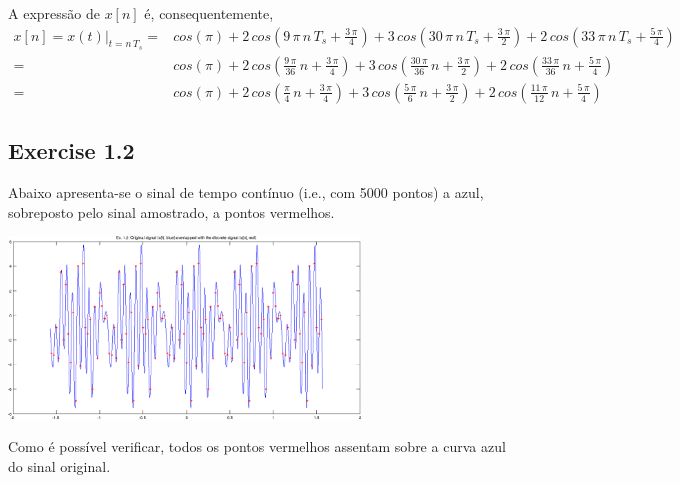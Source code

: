 \documentclass[a4paper]{article}
\begin{document}
\noindent A expressão de $x[n]$ é, consequentemente,
\begin{eqnarray}
	x[n] = x(t)|_{t = n \, T_s} = & cos(\pi) + 2 \, cos\left( 9 \, \pi \, n \, T_s + \frac{3 \, \pi}{4} \right) + 3 \, cos\left( 30 \, \pi \, n \, T_s + \frac{3 \, \pi}{2} \right) + 2 \, cos\left( 33 \, \pi \, n \, T_s + \frac{5 \, \pi}{4} \right) \\
	= & cos(\pi) + 2 \, cos\left( \frac{9 \, \pi}{36} \, n + \frac{3 \, \pi}{4} \right) + 3 \, cos\left( \frac{30 \, \pi}{36} \, n + \frac{3 \, \pi}{2} \right) + 2 \, cos\left( \frac{33 \, \pi}{36} \, n + \frac{5 \, \pi}{4} \right) \\
	= & cos(\pi) + 2 \, cos\left( \frac{\pi}{4} \, n + \frac{3 \, \pi}{4} \right) + 3 \, cos\left( \frac{5 \, \pi}{6} \, n + \frac{3 \, \pi}{2} \right) + 2 \, cos\left( \frac{11 \, \pi}{12} \, n + \frac{5 \, \pi}{4} \right)
\end{eqnarray}

\subsection{Exercise 1.2}
\noindent Abaixo apresenta-se o sinal de tempo contínuo (i.e., com 5000 pontos) a azul, sobreposto pelo sinal amostrado, a pontos vermelhos.
\begin{center}
	\includegraphics[width=0.70\textwidth]{images/ex_1_2.png}
	\label{fig:ex_1_2}
\end{center}

\noindent Como é possível verificar, todos os pontos vermelhos assentam sobre a curva azul do sinal original.
\end{document}
